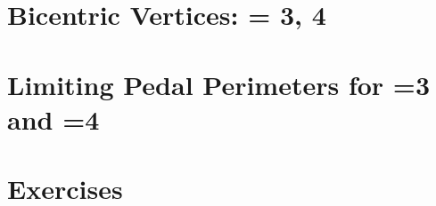 \section{Bicentric Vertices: = 3, 4}
\label{app:bicentric-vertices-n34}
 

\section{Limiting Pedal Perimeters for  =3 and  =4}
\label{app:pedal-perimeters-n34}
 
 

\section{Exercises}
\label{sec:05-exercises}

